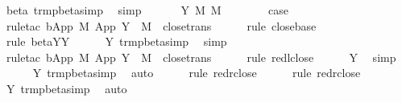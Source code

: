 \begin{isabellebody}
\ beta\ trm{\isacharunderscore}pbeta{\isacharunderscore}simp{}\ \isamarkupfalse%
\ simp\isanewline
\ \ \isamarkupfalse%
\isanewline
\ \ \isamarkupfalse%
\ {\isacharparenleft}Y\ M\ M{\isacharprime}\ {\isasymsigma}{\isacharparenright}\ \isanewline
\ \ \ \ \isamarkupfalse%
\ {\isacharquery}case\isanewline
\ \ \ \ \isamarkupfalse%
\ {\isacharparenleft}rule{\isacharunderscore}tac\ b{\isacharequal}{\isachardoublequoteopen}App\ M\ {\isacharparenleft}App\ {\isacharparenleft}Y\ {\isasymsigma}{\isacharparenright}\ M{\isacharparenright}{\isachardoublequoteclose}\ \ close{\isachardot}trans{\isacharparenright}\isanewline
\ \ \ \ \isamarkupfalse%
\ {\isacharparenleft}rule\ close{\isachardot}base{\isacharparenright}\isanewline
\ \ \ \ \isamarkupfalse%
\ {\isacharparenleft}rule\ beta{\isacharunderscore}Y{\isachardot}Y{\isacharparenright}\isanewline
\ \ \ \ \isamarkupfalse%
\ Y\ trm{\isacharunderscore}pbeta{\isacharunderscore}simp{}\ \isamarkupfalse%
\ simp\isanewline
\ \ \ \ \isamarkupfalse%
\ {\isacharparenleft}rule{\isacharunderscore}tac\ b{\isacharequal}{\isachardoublequoteopen}App\ M{\isacharprime}\ {\isacharparenleft}App\ {\isacharparenleft}Y\ {\isasymsigma}{\isacharparenright}\ M{\isacharparenright}{\isachardoublequoteclose}\ \ close{\isachardot}trans{\isacharparenright}\isanewline
\ \ \ \ \isamarkupfalse%
\ {\isacharparenleft}rule\ red{\isacharunderscore}l{\isacharunderscore}close{\isacharparenright}\isanewline
\ \ \ \ \isamarkupfalse%
\ Y\ \isamarkupfalse%
\ simp\isanewline
\ \ \ \ \isamarkupfalse%
\ Y\ trm{\isacharunderscore}pbeta{\isacharunderscore}simp{}\ \isamarkupfalse%
\ auto{\isacharbrackleft}{}{\isacharbrackright}\isanewline
\ \ \ \ \isamarkupfalse%
\ {\isacharparenleft}rule\ red{\isacharunderscore}r{\isacharunderscore}close{\isacharparenright}\isanewline
\ \ \ \ \isamarkupfalse%
\ {\isacharparenleft}rule\ red{\isacharunderscore}r{\isacharunderscore}close{\isacharparenright}\isanewline
\ \ \ \ \isamarkupfalse%
\ Y\ trm{\isacharunderscore}pbeta{\isacharunderscore}simp{}\ \isamarkupfalse%
\ auto\isanewline
\ \ \isamarkupfalse%
\isanewline
{}\isamarkupfalse%
%
\endisatagproof
{\isafoldproof}%
%
\isadelimproof
%
\endisadelimproof

\end{isabellebody}
